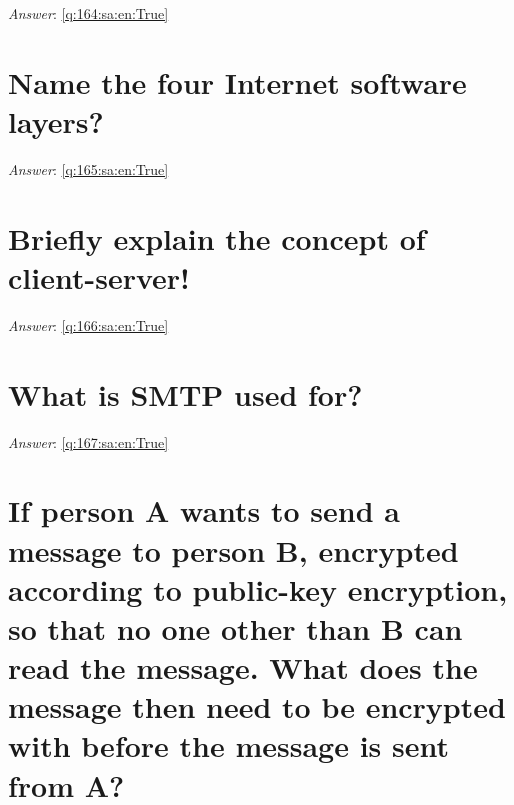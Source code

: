 \documentclass[a4paper,11pt,oneside]{book}
\begin{document}
\begin{sloppypar}
\noindent\makebox[\textwidth]{\hrulefill}

\vspace{1cm}

\textit{Answer}: \autoref{q:164:sa:en:True}



\section{Name the four Internet software layers?}

\label{q:165:sa:en:False}

\vspace{2cm}

\noindent\makebox[\textwidth]{\hrulefill}

\vspace{1cm}

\textit{Answer}: \autoref{q:165:sa:en:True}



\section{Briefly explain the concept of client-server!}

\label{q:166:sa:en:False}

\vspace{2cm}

\noindent\makebox[\textwidth]{\hrulefill}

\vspace{1cm}

\textit{Answer}: \autoref{q:166:sa:en:True}



\section{What is SMTP used for?}

\label{q:167:sa:en:False}

\vspace{2cm}

\noindent\makebox[\textwidth]{\hrulefill}

\vspace{1cm}

\textit{Answer}: \autoref{q:167:sa:en:True}



\section{If person A wants to send a message to person B, encrypted according to public-key encryption, so that no one other than B can read the message. What does the message then need to be encrypted with before the message is sent from A?}


\end{sloppypar}
\end{document}
